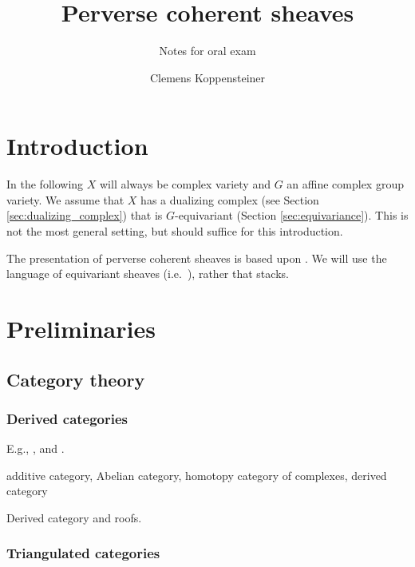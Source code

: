\documentclass[english]{short-notes}
\title{Perverse coherent sheaves}
\subtitle{Notes for oral exam}
\author{Clemens Koppensteiner}
\begin{document}
\renewcommand\top{\mathrm{top}}
\renewcommand\dual{\mathbb D}

\maketitle

\tableofcontents

\section{Introduction}

In the following $X$ will always be complex variety and $G$ an affine complex group variety.
We assume that $X$ has a dualizing complex (see Section \ref{sec:dualizing_complex}) that is $G$-equivariant (Section \ref{sec:equivariance}).
This is not the most general setting, but should suffice for this introduction.

The presentation of perverse coherent sheaves is based upon \cite{Bezrukavnikov:arXiv:PerverseCoherentSheaves,ArinkinBezrukavnikov:arXiv:PerverseCoherentSheaves}.
We will use the language of equivariant sheaves (i.e.~\cite{Bezrukavnikov:arXiv:PerverseCoherentSheaves}), rather that stacks.

\section{Preliminaries}

\subsection{Category theory}

\subsubsection{Derived categories}\label{sec:derived_categories}

E.g., \cite{Verdier:1977:CategoriesDerivees}, \cite[Chapter~III]{GelfandManin:2003:MethodsOfHomologicalAlgebra} and \cite[Chapter 1]{Hartshorne:1966:ResiduesAndDuality}.

\begin{Def}
    additive category,
    Abelian category,
    homotopy category of complexes,
    derived category
\end{Def}

Derived category and roofs.

\subsubsection{Triangulated categories}\label{sec:triangulated_categories}
\end{document}
